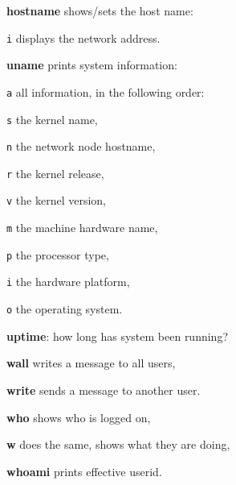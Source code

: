 \begin{compactenum}
	\item [\cmdvar] \textbf{hostname} shows/sets the host name:
	\item [\texttt{i}] displays the network address.
	\item [\cmdvar] \textbf{uname} prints system information:
	\item [\texttt{a}] all information, in the following order:
	\item [\texttt{s}] the kernel name,
	\item [\texttt{n}] the network node hostname,
	\item [\texttt{r}] the kernel release,
	\item [\texttt{v}] the kernel version,
	\item [\texttt{m}] the machine hardware name,
	\item [\texttt{p}] the processor type,
	\item [\texttt{i}] the hardware platform,
	\item [\texttt{o}] the operating system.
\end{compactenum}

\begin{compactenum}
	\item [\cmdvar] \textbf{uptime}: how long has system been running?
\end{compactenum}

\begin{compactenum}
	\item [\cmdutil] \textbf{wall} writes a message to all users,
	\item [\cmdvar] \textbf{write} sends a message to another user. 
\end{compactenum}

\begin{compactenum}
	\item [\cmdvar] \textbf{who} shows who is logged on,
	\item [\cmdvar] \textbf{w} does the same, shows what they are doing,
	\item [\cmdvar] \textbf{whoami} prints effective userid.
\end{compactenum}

\vfill\null
\columnbreak
